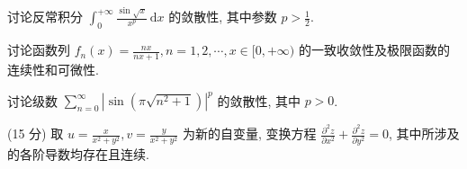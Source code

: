 讨论反常积分 $\int_0^{+\infty} \frac{\sin \sqrt{x}}{x^p} \, \mathrm{d}x$ 的敛散性, 其中参数 $p > \frac{1}{2}$.\par
讨论函数列  $f_{n}(x)=\frac{nx}{nx+1}, n=1,2,\cdots, x\in[0,+\infty)$  的一致收敛性及极限函数的连续性和可微性.\par
讨论级数 $\sum_{n=0}^{\infty}\left|\sin (\pi \sqrt{n^2 + 1})\right|^p$ 的敛散性, 其中 $p > 0$.\par
\par{}
(15 分) 取 $u = \frac{x}{x^2 + y^2}, v = \frac{y}{x^2 + y^2}$ 为新的自变量, 变换方程 $\frac{\partial^2 z}{\partial x^2} + \frac{\partial^2 z}{\partial y^2} = 0$, 其中所涉及的各阶导数均存在且连续.\par
